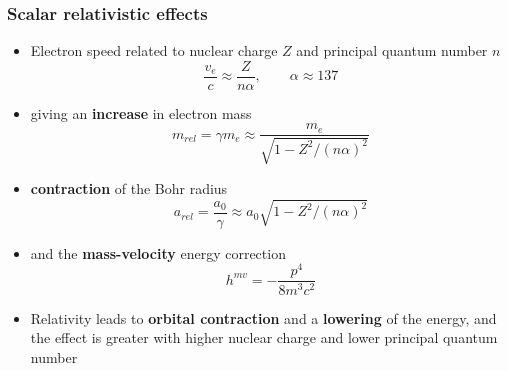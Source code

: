 \documentclass[mathserif,10pt]{beamer}
\begin{document}
\begin{frame}
    \frametitle{Scalar relativistic effects}
    \begin{itemize}
	\item	Electron speed related to nuclear charge $Z$
		and principal quantum number $n$
		\begin{equation}
		    \nonumber
		    \frac{v_e}{c} \approx \frac{Z}{n\alpha},\qquad \alpha \approx 137
		\end{equation}
	\item	giving an \textbf{increase} in electron mass
		\begin{equation}
		    \nonumber
		    m_{rel} = \gamma m_e \approx \frac{m_e}{\sqrt{1-Z^2/(n\alpha)^2}}
		\end{equation}
	\item	\textbf{contraction} of the Bohr radius
		\begin{equation}
		    \nonumber
		    a_{rel} = \frac{a_0}{\gamma} \approx a_0\sqrt{1-Z^2/(n\alpha)^2}
		\end{equation}
	\item	and the \textbf{mass-velocity} energy correction
		\begin{equation}
		    \nonumber
		    h^{mv} = -\frac{p^4}{8m^3c^2}
		\end{equation}
	\item	Relativity leads to \textbf{orbital contraction} and a \textbf{lowering} of the energy, 
		and the effect is greater with higher nuclear charge and lower principal quantum number
	\end{itemize}
\end{frame}
\end{document}
